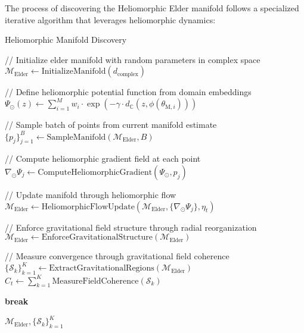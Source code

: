 The process of discovering the Heliomorphic Elder manifold follows a specialized iterative algorithm that leverages heliomorphic dynamics:

\begin{algorithm}
\caption{Heliomorphic Manifold Discovery}
\begin{algorithmic}[1]
    \State // Initialize elder manifold with random parameters in complex space
    \State $\mathcal{M}_{\text{Elder}} \gets \text{InitializeManifold}(d_{\text{complex}})$
    
    \State // Define heliomorphic potential function from domain embeddings
    \State $\Psi_{\odot}(z) \gets \sum_{i=1}^M w_i \cdot \exp(-\gamma \cdot d_{\mathbb{C}}(z, \phi(\theta_{\text{M},i})))$
    
        \State // Sample batch of points from current manifold estimate
        \State $\{p_j\}_{j=1}^B \gets \text{SampleManifold}(\mathcal{M}_{\text{Elder}}, B)$
        
        \State // Compute heliomorphic gradient field at each point
            \State $\nabla_{\odot} \Psi_j \gets \text{ComputeHeliomorphicGradient}(\Psi_{\odot}, p_j)$
        \EndFor
        
        \State // Update manifold through heliomorphic flow
        \State $\mathcal{M}_{\text{Elder}} \gets \text{HeliomorphicFlowUpdate}(\mathcal{M}_{\text{Elder}}, \{\nabla_{\odot} \Psi_j\}, \eta_t)$
        
        \State // Enforce gravitational field structure through radial reorganization
        \State $\mathcal{M}_{\text{Elder}} \gets \text{EnforceGravitationalStructure}(\mathcal{M}_{\text{Elder}})$
        
        \State // Measure convergence through gravitational field coherence
        \State $\{\mathcal{S}_k\}_{k=1}^K \gets \text{ExtractGravitationalRegions}(\mathcal{M}_{\text{Elder}})$
        \State $C_t \gets \sum_{k=1}^K \text{MeasureFieldCoherence}(\mathcal{S}_k)$
        
            \State \textbf{break}
        \EndIf
    \EndFor
    
    \State \Return $\mathcal{M}_{\text{Elder}}, \{\mathcal{S}_k\}_{k=1}^K$
\EndFunction
\end{algorithmic}
\end{algorithm}

